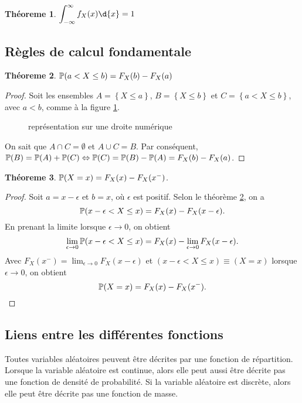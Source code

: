 \documentclass[11pt]{article}
\renewcommand\P{%
	\ensuremath{%
		\mathbb{P}%
	}%
}%
\newtheorem{theoreme}{Théoreme}[section]
\begin{document}
\begin{theoreme}
	$\displaystyle\int_{-\infty}^\infty f_X(x)\d{x}=1$
\end{theoreme}

\subsection{Règles de calcul fondamentale}
\begin{theoreme}\label{th:calc_fond}
	$\P(a<X\leq b)=F_X(b)-F_X(a)$
\end{theoreme}

\begin{proof}
	Soit les ensembles $A=\left\{X\leq a\right\}$, $B=\left\{X\leq b\right\}$
	et $C=\left\{a< X\leq b\right\}$, avec $a<b$, comme à la figure
	\ref{fig:droite_num}.
	\begin{figure}[H]
		\centering
		
		\caption{représentation sur une droite numérique}
		\label{fig:droite_num}
	\end{figure}
	
	On sait que $A\cap C=\emptyset$ et $A\cup C=B$. Par conséquent, 
	$\P(B)=\P(A)+\P(C)\Leftrightarrow \P(C)=\P(B)-\P(A)=F_X(b)-F_X(a)$.
\end{proof}

\begin{theoreme}
	$\P(X=x)=F_X(x)-F_X(x^-)$.
\end{theoreme}

\begin{proof}
	Soit $a=x-\epsilon$ et $b=x$, où $\epsilon$ est positif. Selon le théorème
	\ref{th:calc_fond}, on a
	\begin{equation*}
		\P(x-\epsilon<X\leq x)=F_X(x)-F_X(x-\epsilon).
	\end{equation*}
	En prenant la limite lorsque $\epsilon\rightarrow 0$, on obtient
	\begin{equation*}
		\lim_{\epsilon\rightarrow 0}\P(x-\epsilon<X\leq x)
		=F_X(x)-\lim_{\epsilon\rightarrow 0}F_X(x-\epsilon).
	\end{equation*}
	Avec $F_X(x^-)=\lim_{\epsilon\rightarrow 0}F_X(x-\epsilon)$ et
	$(x-\epsilon<X\leq x)\equiv (X=x)$ lorsque $\epsilon\rightarrow 0$, on
	obtient
	\begin{equation*}
		\P(X=x)=F_X(x)-F_X(x^-).
	\end{equation*}
\end{proof}

\subsection{Liens entre les différentes fonctions}
Toutes variables aléatoires peuvent être décrites par une fonction de
répartition. Lorsque la variable aléatoire est continue, alors elle peut aussi
être décrite pas une fonction de densité de probabilité. Si la variable
aléatoire est discrète, alors elle peut être décrite pas une fonction de masse.
\end{document}
